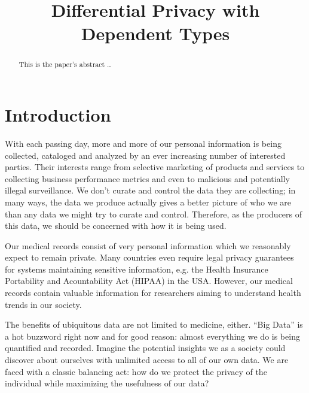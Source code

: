 \documentclass[12pt]{article}
\title{Differential Privacy with Dependent Types}
\begin{document}
\maketitle


\graphicspath{{assets/}}
\begin{abstract}
This is the paper's abstract \ldots
\end{abstract}


\section{Introduction}\label{sec:introduction}

With each passing day, more and more of our personal information is being collected, cataloged and analyzed by an ever increasing number of interested parties.
Their interests range from selective marketing of products and services to collecting business performance metrics and even to malicious and potentially illegal surveillance.
We don't curate and control the data they are collecting;
in many ways, the data we produce actually gives a better picture of who we are than any data we might try to curate and control.
Therefore, as the producers of this data, we should be concerned with how it is being used.

Our medical records consist of very personal information which we reasonably expect to remain private.
Many countries even require legal privacy guarantees for systems maintaining sensitive information, e.g. the Health Insurance Portability and Acountability Act (HIPAA) in the USA.
However, our medical records contain valuable information for researchers aiming to understand health trends in our society.

The benefits of ubiquitous data are not limited to medicine, either.
``Big Data'' is a hot buzzword right now and for good reason: almost everything we do is being quantified and recorded.
Imagine the potential insights we as a society could discover about ourselves with unlimited access to all of our own data.
We are faced with a classic balancing act: how do we protect the privacy of the individual while maximizing the usefulness of our data?
\end{document}
